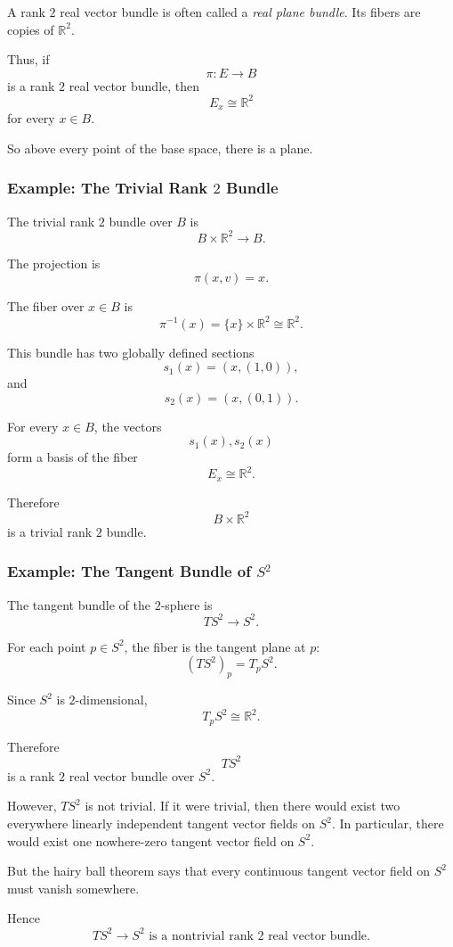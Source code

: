 \documentclass[12pt,a4paper]{article}
\theoremstyle{notespace}
\begin{document}
A rank \(2\) real vector bundle is often called a \emph{real plane bundle}. Its fibers are copies of \(\mathbb R^2\).

Thus, if
\[
\pi:E\to B
\]
is a rank \(2\) real vector bundle, then
\[
E_x\cong \mathbb R^2
\]
for every \(x\in B\).

So above every point of the base space, there is a plane.

\subsubsection{Example: The Trivial Rank \(2\) Bundle}

The trivial rank \(2\) bundle over \(B\) is
\[
B\times \mathbb R^2\longrightarrow B.
\]

The projection is
\[
\pi(x,v)=x.
\]

The fiber over \(x\in B\) is
\[
\pi^{-1}(x)=\{x\}\times \mathbb R^2\cong \mathbb R^2.
\]

This bundle has two globally defined sections
\[
s_1(x)=(x,(1,0)),
\]
and
\[
s_2(x)=(x,(0,1)).
\]

For every \(x\in B\), the vectors
\[
s_1(x),s_2(x)
\]
form a basis of the fiber
\[
E_x\cong \mathbb R^2.
\]

Therefore
\[
B\times \mathbb R^2
\]
is a trivial rank \(2\) bundle.

\subsubsection{Example: The Tangent Bundle of \(S^2\)}

The tangent bundle of the \(2\)-sphere is
\[
TS^2\longrightarrow S^2.
\]

For each point \(p\in S^2\), the fiber is the tangent plane at \(p\):
\[
(TS^2)_p=T_pS^2.
\]

Since \(S^2\) is \(2\)-dimensional,
\[
T_pS^2\cong \mathbb R^2.
\]

Therefore
\[
TS^2
\]
is a rank \(2\) real vector bundle over \(S^2\).

However, \(TS^2\) is not trivial. If it were trivial, then there would exist two everywhere linearly independent tangent vector fields on \(S^2\). In particular, there would exist one nowhere-zero tangent vector field on \(S^2\).

But the hairy ball theorem says that every continuous tangent vector field on \(S^2\) must vanish somewhere.

Hence
\[
\boxed{
	TS^2\to S^2
	\text{ is a nontrivial rank }2\text{ real vector bundle.}
}
\]
\end{document}
